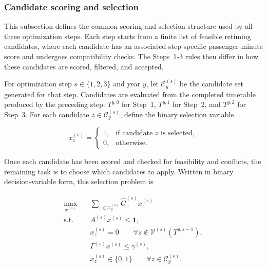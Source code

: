 \documentclass[preprint,12pt]{elsarticle}
\begin{document}
\subsubsection{Candidate scoring and selection}\label{sec:methods-part2-candidate-proxy}
This subsection defines the common scoring and selection structure used by all three optimization steps. Each step starts from a finite list of feasible retiming candidates, where each candidate has an associated step-specific passenger-minute score and undergoes compatibility checks. The Steps~1-3 rules then differ in how these candidates are scored, filtered, and accepted.

For optimization step \(s\in\{1,2,3\}\) and year \(y\), let \(\mathcal{C}^{(s)}_y\) be the candidate set generated for that step. Candidates are evaluated from the completed timetable produced by the preceding step: \(T^{y,0}\) for Step~1, \(T^{y,1}\) for Step~2, and \(T^{y,2}\) for Step~3. For each candidate \(z\in\mathcal{C}^{(s)}_y\), define the binary selection variable

\[
x^{(s)}_z=
\begin{cases}
1, & \text{if candidate }z\text{ is selected},\\
0, & \text{otherwise}.
\end{cases}
\]

Once each candidate has been scored and checked for feasibility and conflicts, the remaining task is to choose which candidates to apply. Written in binary decision-variable form, this selection problem is

\begin{equation}
\begin{aligned}
  \max_{x^{(s)}}\quad
  & \sum_{z\in\mathcal{C}^{(s)}_y}
    \widehat G^{(s)}_z x^{(s)}_z \\
  \text{s.t.}\quad
  & A^{(s)}x^{(s)}\le \mathbf{1},\\
  & x^{(s)}_z=0
    \qquad \forall z\notin\mathcal{V}^{(s)}(T^{y,s-1}),\\
  & \Gamma^{(s)}x^{(s)}\le \gamma^{(s)},\\
  & x^{(s)}_z\in\{0,1\}
    \qquad \forall z\in\mathcal{C}^{(s)}_y .
\end{aligned}
\label{eq:part2-restricted-ip-proxy}
\end{equation}
\end{document}
